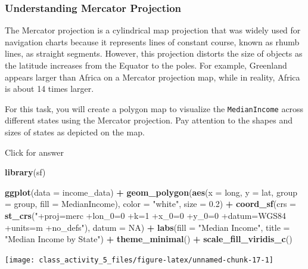 \documentclass[
]{book}
\newenvironment{Shaded}{\begin{snugshade}}{\end{snugshade}}
\newcommand{\AttributeTok}[1]{\textcolor[rgb]{0.13,0.29,0.53}{#1}}
\newcommand{\ConstantTok}[1]{\textcolor[rgb]{0.56,0.35,0.01}{#1}}
\newcommand{\FloatTok}[1]{\textcolor[rgb]{0.00,0.00,0.81}{#1}}
\newcommand{\FunctionTok}[1]{\textcolor[rgb]{0.13,0.29,0.53}{\textbf{#1}}}
\newcommand{\NormalTok}[1]{#1}
\newcommand{\SpecialCharTok}[1]{\textcolor[rgb]{0.81,0.36,0.00}{\textbf{#1}}}
\newcommand{\StringTok}[1]{\textcolor[rgb]{0.31,0.60,0.02}{#1}}
\begin{document}
\hypertarget{understanding-mercator-projection}{%
\subsubsection{Understanding Mercator Projection}\label{understanding-mercator-projection}}

The Mercator projection is a cylindrical map projection that was widely used for navigation charts because it represents lines of constant course, known as rhumb lines, as straight segments. However, this projection distorts the size of objects as the latitude increases from the Equator to the poles. For example, Greenland appears larger than Africa on a Mercator projection map, while in reality, Africa is about 14 times larger.

For this task, you will create a polygon map to visualize the \texttt{MedianIncome} across different states using the Mercator projection. Pay attention to the shapes and sizes of states as depicted on the map.

Click for answer

\begin{Shaded}
\begin{Highlighting}[]
\FunctionTok{library}\NormalTok{(sf)}

\FunctionTok{ggplot}\NormalTok{(}\AttributeTok{data =}\NormalTok{ income\_data) }\SpecialCharTok{+}
  \FunctionTok{geom\_polygon}\NormalTok{(}\FunctionTok{aes}\NormalTok{(}\AttributeTok{x =}\NormalTok{ long, }\AttributeTok{y =}\NormalTok{ lat, }\AttributeTok{group =}\NormalTok{ group, }\AttributeTok{fill =}\NormalTok{ MedianIncome), }\AttributeTok{color =} \StringTok{"white"}\NormalTok{, }\AttributeTok{size =} \FloatTok{0.2}\NormalTok{) }\SpecialCharTok{+}
  \FunctionTok{coord\_sf}\NormalTok{(}\AttributeTok{crs =} \FunctionTok{st\_crs}\NormalTok{(}\StringTok{"+proj=merc +lon\_0=0 +k=1 +x\_0=0 +y\_0=0 +datum=WGS84 +units=m +no\_defs"}\NormalTok{), }\AttributeTok{datum =} \ConstantTok{NA}\NormalTok{) }\SpecialCharTok{+}
  \FunctionTok{labs}\NormalTok{(}\AttributeTok{fill =} \StringTok{"Median Income"}\NormalTok{, }\AttributeTok{title =} \StringTok{"Median Income by State"}\NormalTok{) }\SpecialCharTok{+}
  \FunctionTok{theme\_minimal}\NormalTok{() }\SpecialCharTok{+}
  \FunctionTok{scale\_fill\_viridis\_c}\NormalTok{()}
\end{Highlighting}
\end{Shaded}

\texttt{[image: class\_activity\_5\_files/figure-latex/unnamed-chunk-17-1]}
\end{document}
